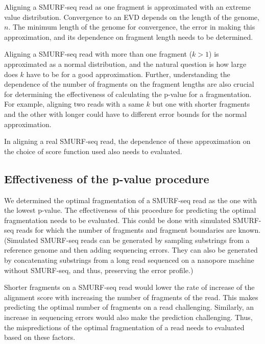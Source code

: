 Aligning a SMURF-seq read as one fragment is approximated with an
extreme value distribution. Convergence to an EVD depends on the length
of the genome, $n$. The minimum length of the genome for convergence,
the error in making this approximation, and its dependence on fragment
length needs to be determined.

Aligning a SMURF-seq read with more than one fragment ($k > 1$) is
approximated as a normal distribution, and the natural question is how
large does $k$ have to be for a good approximation. Further,
understanding the dependence of the number of fragments on the fragment
lengths are also crucial for determining the effectiveness of
calculating the p-value for a fragmentation. For example, aligning two
reads with a same $k$ but one with shorter fragments and the other with
longer could have to different error bounds for the normal
approximation.

In aligning a real SMURF-seq read, the dependence of these approximation
on the choice of score function used also needs to evaluated.


\subsection*{Effectiveness of the p-value procedure}
We determined the optimal fragmentation of a SMURF-seq read as the one
with the lowest p-value. The effectiveness of this procedure for
predicting the optimal fragmentation needs to be evaluated. This could
be done with simulated SMURF-seq reads for which the number of fragments
and fragment boundaries are known. (Simulated SMURF-seq reads can be
generated by sampling substrings from a reference genome and then adding
sequencing errors. They can also be generated by concatenating
substrings from a long read sequenced on a nanopore machine without
SMURF-seq, and thus, preserving the error profile.)

Shorter fragments on a SMURF-seq read would lower the rate of increase
of the alignment score with increasing the number of fragments of the
read. This makes predicting the optimal number of fragments on a read
challenging.
Similarly, an increase in sequencing errors would also make the
prediction challenging.
%
Thus, the mispredictions of the optimal fragmentation of a read needs to
evaluated based on these factors.

